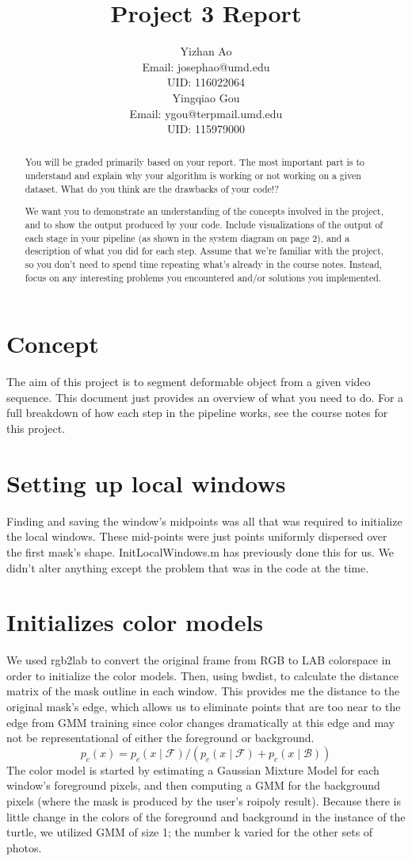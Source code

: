 \documentclass[15pt]{article}
\title{Project 3 Report}
\author{%
  Yizhan Ao\\
  Email: josephao@umd.edu   \\
  UID: 116022064\\
  \And
  Yingqiao Gou\\
  Email: ygou@terpmail.umd.edu\\
  UID: 115979000\\
}
\begin{document}
 
\maketitle

\begin{abstract}
You will be graded primarily based on your report.
The most important part is to understand and explain why your algorithm is working or not working on a given dataset. What do you think are the drawbacks of your code!?

We want you to demonstrate an understanding of the concepts involved in the project, and to show the output produced by your code.
Include visualizations of the output of each stage in your pipeline (as shown in the system diagram on page 2), and a description of what you did for each step. Assume that we’re familiar with the project, so you don’t need to spend time repeating what’s already in the course notes. Instead, focus on any interesting problems you encountered and/or solutions you implemented.
\end{abstract}

\section{Concept}
The aim of this project is to segment deformable object from a given video sequence. This document just provides an overview of what you need to do. For a full breakdown of how each step in the pipeline works, see the course notes for this project.

\section{Setting up local windows}
Finding and saving the window's midpoints was all that was required to initialize the local windows. These mid-points were just points uniformly dispersed over the first mask's shape. InitLocalWindows.m has previously done this for us. We didn't alter anything except the problem that was in the code at the time.
\section{Initializes color models}
We used rgb2lab to convert the original frame from RGB to LAB colorspace in order to initialize the color models. Then, using bwdist, to calculate the distance matrix of the mask outline in each window. This provides me the distance to the original mask's edge, which allows us to eliminate points that are too near to the edge from GMM training since color changes dramatically at this edge and may not be representational of either the foreground or background.
\begin{equation}
p_{c}(x)=p_{c}(x \mid \mathcal{F}) /\left(p_{c}(x \mid \mathcal{F})+p_{c}(x \mid \mathcal{B})\right)
\end{equation}
The color model is started by estimating a Gaussian Mixture Model for each window's foreground pixels, and then computing a GMM for the background pixels (where the mask is produced by the user's roipoly result). Because there is little change in the colors of the foreground and background in the instance of the turtle, we utilized GMM of size 1; the number k varied for the other sets of photos.
\end{document}
